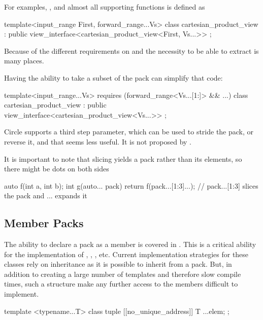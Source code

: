\documentclass{wg21}
\begin{document}
For examples, , and almost all supporting functions is defined as

\begin{colorblock}
template<input_range First, forward_range...Vs>
class cartesian_product_view : public view_interface<cartesian_product_view<First, Vs...>> {};
\end{colorblock}

Because of the different requirements on  and the necessity to be able to extract 
is many places.

Having the ability to take a subset of the pack can simplify that code:

\begin{colorblock}
template<input_range...Vs>
requires (forward_range<Vs...[1:]> && ...)
class cartesian_product_view : public view_interface<cartesian_product_view<Vs...>> {};
\end{colorblock}


Circle supports a third step parameter, which can be used to stride the pack, or reverse it,
and that seems less useful. It is not proposed by .

It is important to note that slicing yields a pack rather than its elements, so there might be dots on both sides

\begin{colorblock}
auto f(int a, int b);
int g(auto... pack) {
    return f(pack...[1:3]...); // pack...[1:3] slices the pack and ... expands it
}
\end{colorblock}

\subsection{Member Packs}

The ability to declare a pack as a member is covered in .
This is a critical ability for the implementation of , , , etc.
Current implementation strategies for these classes rely on inheritance as it is possible to inherit from a pack.
But, in addition to creating a large number of templates and therefore slow compile times, such a structure make any further access to the members
difficult to implement.

\begin{colorblock}
template <typename...T>
class tuple {
    [[no_unique_address]] T ...elem;
};
\end{colorblock}
\end{document}
